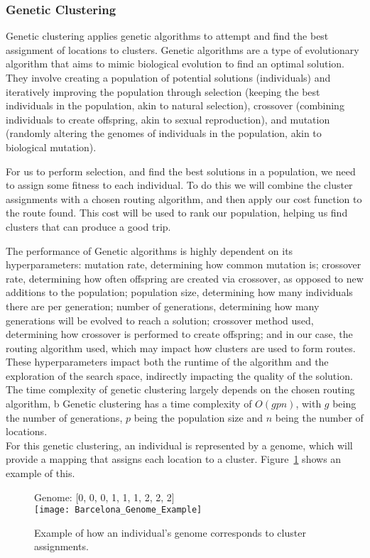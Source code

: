 \subsubsection{Genetic Clustering}
Genetic clustering applies genetic algorithms to attempt and find the best assignment of locations to clusters.
Genetic algorithms are a type of evolutionary algorithm that aims to mimic biological evolution to find an optimal
solution.
They involve creating a population of potential solutions (individuals) and iteratively improving the population
through selection (keeping the best individuals in the population, akin to natural selection), crossover (combining
individuals to create offspring, akin to sexual reproduction), and mutation (randomly altering the genomes
of individuals in the population, akin to biological mutation).

For us to perform selection, and find the best solutions in a population, we need to assign some fitness to each
individual.
To do this we will combine the cluster assignments with a chosen routing algorithm, and then apply our cost function
to the route found.
This cost will be used to rank our population, helping us find clusters that can produce a good trip.

The performance of Genetic algorithms is highly dependent on its hyperparameters: mutation rate, determining how
common mutation is; crossover rate, determining how often offspring are created via crossover, as opposed to new
additions to the population; population size, determining how many individuals there are per generation; number of
generations, determining how many generations will be evolved to reach a solution; crossover method used,
determining how crossover is performed to create offspring; and in our case, the routing algorithm used, which may
impact how clusters are used to form routes.
These hyperparameters impact both the runtime of the algorithm and the exploration of the search space, indirectly
impacting the quality of the solution.
The time complexity of genetic clustering largely depends on the chosen routing algorithm, b
Genetic clustering has a time complexity of $O(gpn)$, with $g$ being the number of generations, $p$ being the
population size and $n$ being the number of locations.\\

\noindent
For this genetic clustering, an individual is represented by a genome, which will provide a mapping that assigns each
location to a cluster.
Figure~\ref{fig:barcelona-genome-example} shows an example of this.
\begin{figure}[H]
    \centering
    Genome: [0, 0, 0, 1, 1, 1, 2, 2, 2]\\
    \texttt{[image: Barcelona\_Genome\_Example]}
    \caption{Example of how an individual's genome corresponds to cluster assignments.}\label{fig:barcelona-genome-example}
\end{figure}

